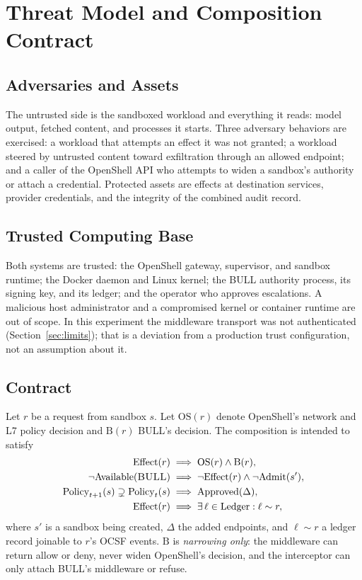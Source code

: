 \documentclass[journal]{IEEEtran}
\newcommand{\bull}{\textsc{BULL}}
\newcommand{\openshell}{OpenShell}
\begin{document}
\section{Threat Model and Composition Contract}
\subsection{Adversaries and Assets}
The untrusted side is the sandboxed workload and everything it reads: model output, fetched content, and processes it starts. Three adversary behaviors are exercised: a workload that attempts an effect it was not granted; a workload steered by untrusted content toward exfiltration through an allowed endpoint; and a caller of the \openshell{} API who attempts to widen a sandbox's authority or attach a credential. Protected assets are effects at destination services, provider credentials, and the integrity of the combined audit record.

\subsection{Trusted Computing Base}
Both systems are trusted: the \openshell{} gateway, supervisor, and sandbox runtime; the Docker daemon and Linux kernel; the \bull{} authority process, its signing key, and its ledger; and the operator who approves escalations. A malicious host administrator and a compromised kernel or container runtime are out of scope. In this experiment the middleware transport was not authenticated (Section~\ref{sec:limits}); that is a deviation from a production trust configuration, not an assumption about it.

\subsection{Contract}
Let $r$ be a request from sandbox $s$. Let $\mathrm{OS}(r)$ denote \openshell{}'s network and L7 policy decision and $\mathrm{B}(r)$ \bull{}'s decision. The composition is intended to satisfy
\begin{align*}
\mathrm{Effect}(r) \implies{} & \mathrm{OS}(r) \land \mathrm{B}(r), \\
\neg\mathrm{Available}(\bull) \implies{} & \neg\mathrm{Effect}(r) \land \neg\mathrm{Admit}(s'), \\
\mathrm{Policy}_{t+1}(s) \supsetneq \mathrm{Policy}_t(s) \implies{} & \mathrm{Approved}(\Delta), \\
\mathrm{Effect}(r) \implies{} & \exists\, \ell \in \mathrm{Ledger}: \ell \sim r,
\end{align*}
where $s'$ is a sandbox being created, $\Delta$ the added endpoints, and $\ell \sim r$ a ledger record joinable to $r$'s OCSF events. $\mathrm{B}$ is \emph{narrowing only}: the middleware can return allow or deny, never widen \openshell{}'s decision, and the interceptor can only attach \bull{}'s middleware or refuse.
\end{document}
